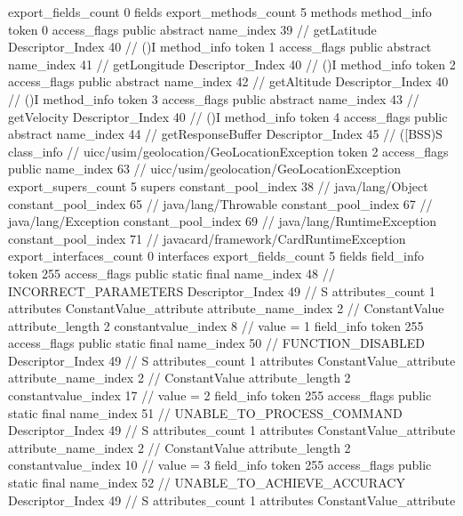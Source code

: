 {{{{			}
			export_fields_count	0
			fields {
			}
			export_methods_count	5
			methods {
				method_info {
					token	0
					access_flags	public abstract
					name_index	39		// getLatitude
					Descriptor_Index	40		// ()I
				}
				method_info {
					token	1
					access_flags	public abstract
					name_index	41		// getLongitude
					Descriptor_Index	40		// ()I
				}
				method_info {
					token	2
					access_flags	public abstract
					name_index	42		// getAltitude
					Descriptor_Index	40		// ()I
				}
				method_info {
					token	3
					access_flags	public abstract
					name_index	43		// getVelocity
					Descriptor_Index	40		// ()I
				}
				method_info {
					token	4
					access_flags	public abstract
					name_index	44		// getResponseBuffer
					Descriptor_Index	45		// ([BSS)S
				}
			}
		}
		class_info {		// uicc/usim/geolocation/GeoLocationException
			token	2
			access_flags	public
			name_index	63		// uicc/usim/geolocation/GeoLocationException
			export_supers_count	5
			supers {
				constant_pool_index	38		// java/lang/Object
				constant_pool_index	65		// java/lang/Throwable
				constant_pool_index	67		// java/lang/Exception
				constant_pool_index	69		// java/lang/RuntimeException
				constant_pool_index	71		// javacard/framework/CardRuntimeException
			}
			export_interfaces_count	0
			interfaces {
			}
			export_fields_count	5
			fields {
			field_info {
				token	255
				access_flags	public static final
				name_index	48		// INCORRECT_PARAMETERS
				Descriptor_Index	49		// S
				attributes_count	1
				attributes {
				ConstantValue_attribute {
					attribute_name_index	2		// ConstantValue
					attribute_length	2
					constantvalue_index	8		// value = 1
				}
				}
			}
			field_info {
				token	255
				access_flags	public static final
				name_index	50		// FUNCTION_DISABLED
				Descriptor_Index	49		// S
				attributes_count	1
				attributes {
				ConstantValue_attribute {
					attribute_name_index	2		// ConstantValue
					attribute_length	2
					constantvalue_index	17		// value = 2
				}
				}
			}
			field_info {
				token	255
				access_flags	public static final
				name_index	51		// UNABLE_TO_PROCESS_COMMAND
				Descriptor_Index	49		// S
				attributes_count	1
				attributes {
				ConstantValue_attribute {
					attribute_name_index	2		// ConstantValue
					attribute_length	2
					constantvalue_index	10		// value = 3
				}
				}
			}
			field_info {
				token	255
				access_flags	public static final
				name_index	52		// UNABLE_TO_ACHIEVE_ACCURACY
				Descriptor_Index	49		// S
				attributes_count	1
				attributes {
				ConstantValue_attribute {
}}}}}}}
